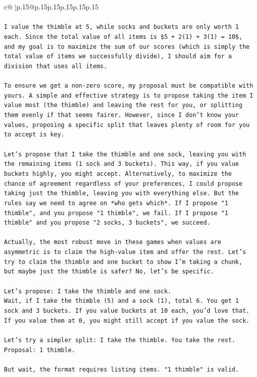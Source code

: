 \documentclass{article}
\begin{document}
{\begin{supertabular}{c@{$\;$}|p{.15\linewidth}@{}p{.15\linewidth}p{.15\linewidth}p{.15\linewidth}p{.15\linewidth}p{.15\linewidth}}
{{{\\ 
\\ 
\texttt{I value the thimble at 5, while socks and buckets are only worth 1 each. Since the total value of all items is \$5 + 2(1) + 3(1) = 10\$, and my goal is to maximize the sum of our scores (which is simply the total value of items we successfully divide), I should aim for a division that uses all items.} \\
\\ 
\texttt{To ensure we get a non{-}zero score, my proposal must be compatible with yours. A simple and effective strategy is to propose taking the item I value most (the thimble) and leaving the rest for you, or splitting them evenly if that seems fairer. However, since I don't know your values, proposing a specific split that leaves plenty of room for you to accept is key.} \\
\\ 
\texttt{Let's propose that I take the thimble and one sock, leaving you with the remaining items (1 sock and 3 buckets). This way, if you value buckets highly, you might accept. Alternatively, to maximize the chance of agreement regardless of your preferences, I could propose taking just the thimble, leaving you with everything else. But the rules say we need to agree on *who gets which*. If I propose "1 thimble", and you propose "1 thimble", we fail. If I propose "1 thimble" and you propose "2 socks, 3 buckets", we succeed.} \\
\\ 
\texttt{Actually, the most robust move in these games when values are asymmetric is to claim the high{-}value item and offer the rest. Let's try to claim the thimble and one bucket to show I'm taking a chunk, but maybe just the thimble is safer? No, let's be specific.} \\
\\ 
\texttt{Let's propose: I take the thimble and one sock.} \\
\texttt{Wait, if I take the thimble (5) and a sock (1), total 6. You get 1 sock and 3 buckets. If you value buckets at 10 each, you'd love that. If you value them at 0, you might still accept if you value the sock.} \\
\\ 
\texttt{Let's try a simpler split: I take the thimble. You take the rest.} \\
\texttt{Proposal: 1 thimble.} \\
\\ 
\texttt{But wait, the format requires listing items. "1 thimble" is valid.} \\
}}}
\end{supertabular}}
\end{document}
